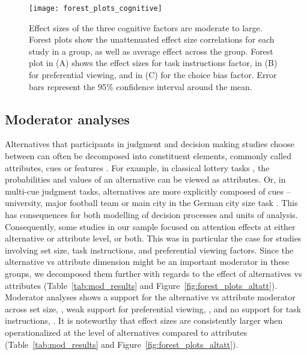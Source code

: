 \begin{figure}[!h]
\texttt{[image: forest\_plots\_cognitive]}
\centering
\caption{Effect sizes of the three cognitive factors are moderate to large. Forest plots show the unattenuated effect size correlations for each study in a group, as well as average effect across the group. Forest plot in (A) shows the effect sizes for task instructions factor, in (B) for preferential viewing, and in (C) for the choice bias factor. Error bars represent the 95\% confidence interval around the mean.}
\label{fig:forest_plots_cognitive}
\end{figure}


\subsection{Moderator analyses}

Alternatives that participants in judgment and decision making studies choose between can often be decomposed into constituent elements, commonly called attributes, cues or features \citep{payne1988,tversky1972elimination,stojic2020s,gigerenzer1996reasoning,schulz2018putting,hogarth2007heuristic}. For example, in classical lottery tasks \citep{tversky1979}, the probabilities and values of an alternative can be viewed as attributes. Or, in multi-cue judgment tasks, alternatives are more explicitly composed of cues -- university, major football team or main city in the German city size task \citep{gigerenzer1996reasoning}. This has consequences for both modelling of decision processes and units of analysis. Consequently, some studies in our sample focused on attention effects at either alternative or attribute level, or both. This was in particular the case for studies involving set size, task instructions, and preferential viewing factors. Since the alternative vs attribute dimension might be an important moderator in these groups, we decomposed them further with regards to the effect of alternatives vs attributes (Table~\ref{tab:mod_results} and Figure~\ref{fig:forest_plots_altatt}). Moderator analyses shows a support for the alternative vs attribute moderator across set size, , weak support for preferential viewing, , and no support for task instructions, . It is noteworthy that effect sizes are consistently larger when operationalized at the level of alternatives compared to attributes (Table~\ref{tab:mod_results} and Figure~\ref{fig:forest_plots_altatt}). 

